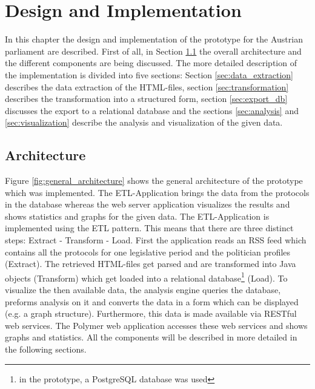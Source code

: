 

\chapter{Design and Implementation}
\label{chap:implementation}

In this chapter the design and implementation of the prototype for the Austrian parliament are described. First of all, in Section \ref{sec:architecture} the overall architecture and the different components are being discussed. The more detailed description of the implementation is divided into five sections: Section \ref{sec:data_extraction} describes the data extraction of the HTML-files, section \ref{sec:transformation} describes the transformation into a structured form, section \ref{sec:export_db} discusses the export to a relational database and the sections \ref{sec:analysis} and \ref{sec:visualization} describe the analysis and visualization of the given data.


\section{Architecture}
\label{sec:architecture}
Figure \ref{fig:general_architecture} shows the general architecture of the prototype which was implemented. The ETL-Application brings the data from the protocols in the database whereas the web server application visualizes the results and shows statistics and graphs for the given data. The ETL-Application is implemented using the ETL pattern. This means that there are three distinct steps: Extract - Transform - Load. First the application reads an RSS feed which contains all the protocols for one legislative period and the politician profiles (Extract). The retrieved HTML-files get parsed and are transformed into Java objects (Transform) which get loaded into a relational database\footnote{in the prototype, a PostgreSQL database was used} (Load). To visualize the then available data, the analysis engine queries the database, preforms analysis on it and converts the data in a form which can be displayed (e.g. a graph structure). Furthermore, this data is made available via RESTful web services. The Polymer web application accesses these web services and shows graphs and statistics. All the components will be described in more detailed in the following sections.

